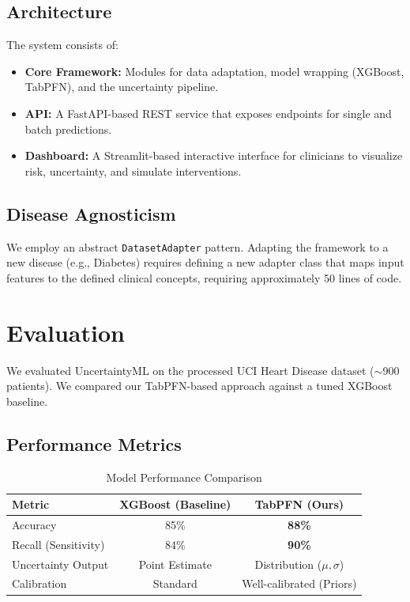 \documentclass[conference]{IEEEtran}
\begin{document}
\subsection{Architecture}
The system consists of:
\begin{itemize}
    \item \textbf{Core Framework:} Modules for data adaptation, model wrapping (XGBoost, TabPFN), and the uncertainty pipeline.
    \item \textbf{API:} A FastAPI-based REST service that exposes endpoints for single and batch predictions.
    \item \textbf{Dashboard:} A Streamlit-based interactive interface for clinicians to visualize risk, uncertainty, and simulate interventions.
\end{itemize}

\subsection{Disease Agnosticism}
We employ an abstract \texttt{DatasetAdapter} pattern. Adapting the framework to a new disease (e.g., Diabetes) requires defining a new adapter class that maps input features to the defined clinical concepts, requiring approximately 50 lines of code.

\section{Evaluation}
We evaluated UncertaintyML on the processed UCI Heart Disease dataset ($\sim$900 patients). We compared our TabPFN-based approach against a tuned XGBoost baseline.

\subsection{Performance Metrics}
\begin{table}[htbp]
\caption{Model Performance Comparison}
\begin{center}
\begin{tabular}{|l|c|c|}
\hline
\textbf{Metric} & \textbf{XGBoost (Baseline)} & \textbf{TabPFN (Ours)} \\
\hline
Accuracy & 85\% & \textbf{88\%} \\
\hline
Recall (Sensitivity) & 84\% & \textbf{90\%} \\
\hline
Uncertainty Output & Point Estimate & Distribution ($\mu, \sigma$) \\
\hline
Calibration & Standard & Well-calibrated (Priors) \\
\hline
\end{tabular}
\label{tab1}
\end{center}
\end{table}
\end{document}
